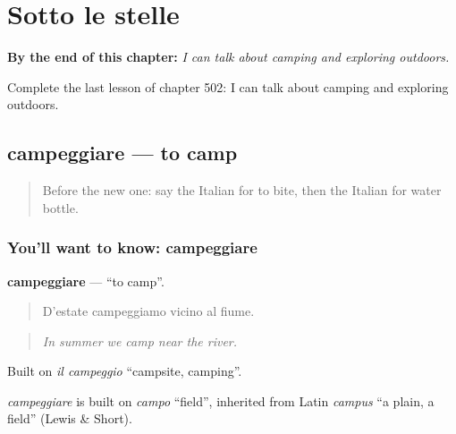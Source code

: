 
\chapter{Sotto le stelle}
\label{ch:it-sotto-le-stelle}

\begin{chapteropening}
\textbf{By the end of this chapter:} \emph{I can talk about camping and exploring outdoors.}

Complete the last lesson of chapter 502: I can talk about camping and exploring outdoors.
\end{chapteropening}

\section[campeggiare]{campeggiare — to camp}

\label{lesson:IT-C502-campeggiare}



\begin{quote}
Before the new one: say the Italian for to bite, then the Italian for water bottle.
\end{quote}

\subsection*{You'll want to know: campeggiare}
\textbf{campeggiare} — \textquotedblleft{}to camp\textquotedblright{}.

\begin{quote}
D'estate campeggiamo vicino al fiume.
\end{quote}

\begin{quote}
\emph{In summer we camp near the river.}
\end{quote}

Built on \emph{il campeggio} \textquotedblleft{}campsite, camping\textquotedblright{}.

\begin{cousinweb}
\emph{campeggiare} is built on \emph{campo} \textquotedblleft{}field\textquotedblright{}, inherited from Latin \emph{campus} \textquotedblleft{}a plain, a field\textquotedblright{} (Lewis \& Short).
\end{cousinweb}

